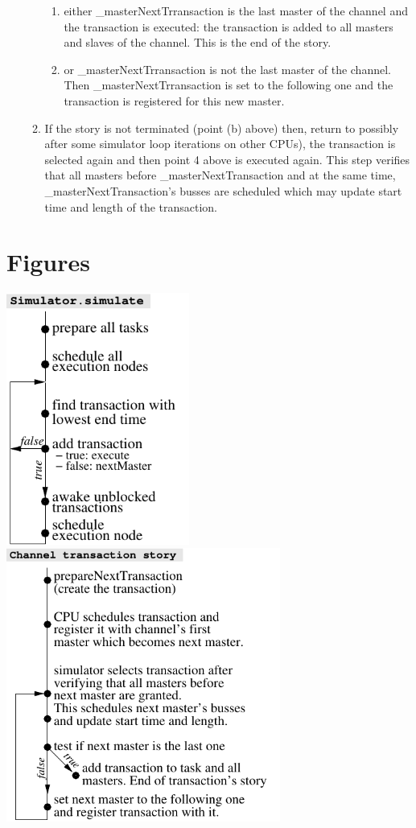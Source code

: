 \documentclass[a4paper,11pt]{article}
\newcommand{\cod}[1]{{\ttfamily #1}}
\begin{document}
\begin{itemize}
\begin{enumerate}
	  	\begin{enumerate}
	  		\item either \cod{\_masterNextTrransaction} is the last master of the channel and the transaction is executed: the transaction is added to all masters and slaves of the channel. This is the end of the story.
	  		\item or \cod{\_masterNextTrransaction} is not the last master of the channel. Then \cod{\_masterNextTrransaction} is set to the following one and the transaction is registered for this new master. 
	  	\end{enumerate}
	  	\item If the story is not terminated (point (b) above) then, return to possibly after some simulator loop iterations on other CPUs), the transaction is selected again and then point 4 above is executed again. This step verifies that all masters before \cod{\_masterNextTransaction} and at the same time, \cod{\_masterNextTransac\-tion}'s busses are scheduled which may update start time and length of the transaction.
	  \end{enumerate}

\end{itemize}

\section*{Figures}
\includegraphics[width=6cm]{images/simulate.pdf}\hspace{5mm}
\includegraphics[width=9cm]{images/channelTrans.pdf}
\end{document}
